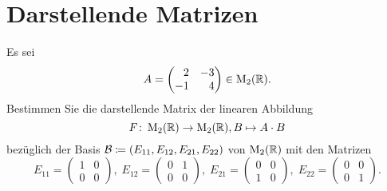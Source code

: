 \section{Darstellende Matrizen}


\begin{question}
 Es sei
 \[
  A =
  \begin{pmatrix*}[r]
    2 & -3 \\
   -1 &  4
  \end{pmatrix*}
  \in \Mat_2(\R).
 \]
 Bestimmen Sie die darstellende Matrix der linearen Abbildung
 \[
  F \colon \operatorname{M}_2(\mathbb{R}) \to \operatorname{M}_2(\mathbb{R}), B \mapsto A \cdot B
 \]
 bezüglich der Basis $\mathcal{B} \coloneqq (E_{11}, E_{12}, E_{21}, E_{22})$ von $\operatorname{M}_2(\mathbb{R})$ mit den Matrizen
 \[
  E_{11} = \begin{pmatrix} 1 & 0 \\ 0 & 0 \end{pmatrix},\;
  E_{12} = \begin{pmatrix} 0 & 1 \\ 0 & 0 \end{pmatrix},\;
  E_{21} = \begin{pmatrix} 0 & 0 \\ 1 & 0 \end{pmatrix},\;
  E_{22} = \begin{pmatrix} 0 & 0 \\ 0 & 1 \end{pmatrix}.
 \]
\end{question}
